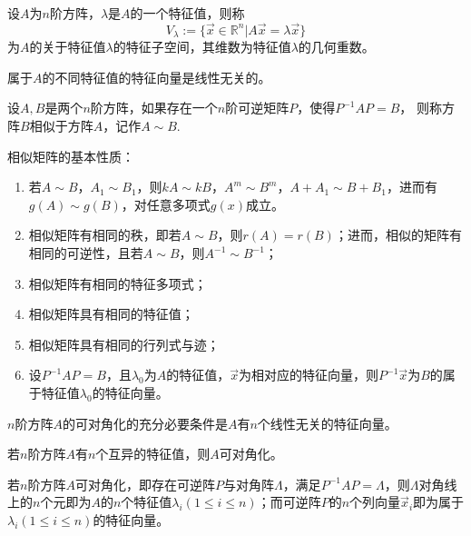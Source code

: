 \begin{Def}
设$A$为$n$阶方阵，$\lambda$是$A$的一个特征值，则称
$$V_{\lambda}:=\{\vec{x}\in\mathbb{R}^n|A\vec{x}=\lambda\vec{x}\}$$
为$A$的关于特征值$\lambda$的特征子空间，其维数为特征值$\lambda$的几何重数。
\end{Def}

\begin{thm}
属于$A$的不同特征值的特征向量是线性无关的。
\end{thm}

\begin{Def}
设$A,B$是两个$n$阶方阵，如果存在一个$n$阶可逆矩阵$P$，使得$P^{-1}AP=B$，
则称方阵$B$相似于方阵$A$，记作$A\sim B$.
\end{Def}

\begin{cor}
相似矩阵的基本性质：
\begin{enumerate}
  \item 若$A\sim B$，$A_1\sim B_1$，则$kA\sim kB$，$A^m\sim B^m$，$A+A_1\sim B+B_1$，进而有$g(A)\sim g(B)$，对任意多项式$g(x)$成立。
  \item 相似矩阵有相同的秩，即若$A\sim B$，则$r(A)=r(B)$；进而，相似的矩阵有
  相同的可逆性，且若$A\sim B$，则$A^{-1}\sim B^{-1}$；
  \item 相似矩阵有相同的特征多项式；
  \item 相似矩阵具有相同的特征值；
  \item 相似矩阵具有相同的行列式与迹；
  \item 设$P^{-1}AP=B$，且$\lambda_0$为$A$的特征值，$\vec{x}$为相对应的特征向量，则$P^{-1}\vec{x}$为$B$的属于特征值$\lambda_0$的特征向量。
\end{enumerate}
\end{cor}

\begin{thm}
$n$阶方阵$A$的可对角化的充分必要条件是$A$有$n$个线性无关的特征向量。
\end{thm}

\begin{cor}
若$n$阶方阵$A$有$n$个互异的特征值，则$A$可对角化。
\end{cor}

\begin{cor}
若$n$阶方阵$A$可对角化，即存在可逆阵$P$与对角阵$\Lambda$，满足$P^{-1}AP=\Lambda$，则$\Lambda$对角线上的$n$个元即为$A$的$n$个特征值$\lambda_i(1\leq i\leq n)$；而可逆阵$P$的$n$个列向量$\vec{x}_i$即为属于
$\lambda_i(1\leq i\leq n)$的特征向量。
\end{cor}

